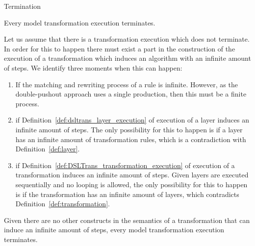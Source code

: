 \begin{proposition}{Termination}

Every model transformation execution terminates.
\end{proposition}
\begin{pf}
Let us assume that there is a transformation execution which does not terminate. In order for this to happen there must exist a part in the construction of the execution of a transformation which induces an algorithm with an infinite amount of steps. We identify three moments when this can happen:
\begin{enumerate}

\item If the matching and rewriting process of a rule is infinite. However, as the double-pushout approach uses a single production, then this must be a finite process. 



\item if Definition~\ref{def:dsltrans_layer_execution} of execution of a layer induces an infinite amount of steps. The only possibility for this to happen is if a layer has an infinite amount of transformation rules, which is a contradiction with Definition~\ref{def:layer}.

\item if Definition~\ref{def:DSLTrans_transformation_execution} of execution of a transformation induces an infinite amount of steps. Given layers are executed sequentially and no looping is allowed, the only possibility for this to happen is if the transformation has an infinite amount of layers, which contradicts Definition~\ref{def:transformation}.


\end{enumerate}
Given there are no other constructs in the semantics of a transformation that can induce an infinite amount of steps, every model transformation execution terminates.
\end{pf}

